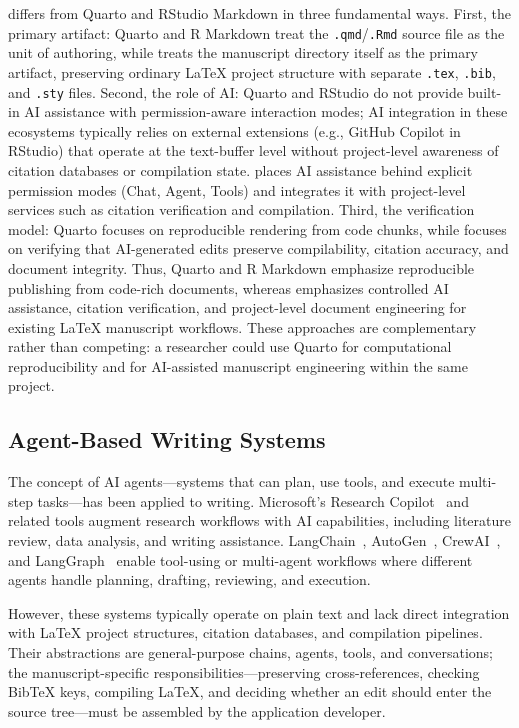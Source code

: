 \software{} differs from Quarto and RStudio Markdown in three fundamental ways.
First, the primary artifact: Quarto and R Markdown treat the \texttt{.qmd}/\texttt{.Rmd}
source file as the unit of authoring, while \software{} treats the manuscript
directory itself as the primary artifact, preserving ordinary \LaTeX{} project
structure with separate \texttt{.tex}, \texttt{.bib}, and \texttt{.sty} files.
Second, the role of AI: Quarto and RStudio do not provide built-in AI
assistance with permission-aware interaction modes; AI integration in these
ecosystems typically relies on external extensions (e.g., GitHub Copilot in
RStudio) that operate at the text-buffer level without project-level awareness
of citation databases or compilation state. \software{} places AI assistance
behind explicit permission modes (Chat, Agent, Tools) and integrates it with
project-level services such as citation verification and compilation. Third,
the verification model: Quarto focuses on reproducible rendering from code
chunks, while \software{} focuses on verifying that AI-generated edits preserve
compilability, citation accuracy, and document integrity. Thus, Quarto and
R Markdown emphasize reproducible publishing from code-rich documents, whereas
\software{} emphasizes controlled AI assistance, citation verification, and
project-level document engineering for existing \LaTeX{} manuscript workflows.
These approaches are complementary rather than competing: a researcher could
use Quarto for computational reproducibility and \software{} for AI-assisted
manuscript engineering within the same project.

\subsection{Agent-Based Writing Systems}

The concept of AI agents---systems that can plan, use tools, and execute
multi-step tasks---has been applied to writing. Microsoft's Research
Copilot~\cite{microsoft2024researchcopilot} and related tools augment
research workflows with AI capabilities, including literature review,
data analysis, and writing assistance. LangChain~\cite{langchain},
AutoGen~\cite{autogen}, CrewAI~\cite{crewai}, and
LangGraph~\cite{langgraph} enable tool-using or multi-agent workflows where
different agents handle planning, drafting, reviewing, and execution.

However, these systems typically operate on plain text and lack direct
integration with \LaTeX{} project structures, citation databases, and
compilation pipelines. Their abstractions are general-purpose chains, agents,
tools, and conversations; the manuscript-specific responsibilities---preserving
cross-references, checking BibTeX keys, compiling \LaTeX{}, and deciding whether
an edit should enter the source tree---must be assembled by the application
developer.

